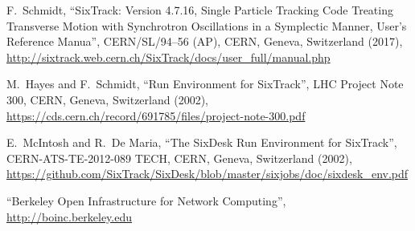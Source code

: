 \begin{thebibliography}{99}
  
  F.~Schmidt, ``SixTrack: Version 4.7.16, Single Particle
  Tracking Code Treating Transverse Motion with Synchrotron
  Oscillations in a Symplectic Manner, User's Reference Manua'',
  CERN/SL/94--56 (AP), CERN, Geneva, Switzerland (2017),
  \url{http://sixtrack.web.cern.ch/SixTrack/docs/user_full/manual.php}
  
  M.~Hayes and F.~Schmidt, ``Run Environment for SixTrack'',
  LHC Project Note 300, CERN, Geneva, Switzerland (2002),
  \url{https://cds.cern.ch/record/691785/files/project-note-300.pdf}

  E.~McIntosh and R.~De Maria, ``The SixDesk Run Environment for SixTrack'',
  CERN-ATS-TE-2012-089 TECH, CERN, Geneva, Switzerland (2002),
  \url{https://github.com/SixTrack/SixDesk/blob/master/sixjobs/doc/sixdesk_env.pdf}

 ``Berkeley Open Infrastructure for Network Computing'',
  \url{http://boinc.berkeley.edu}
  
\end{thebibliography}

